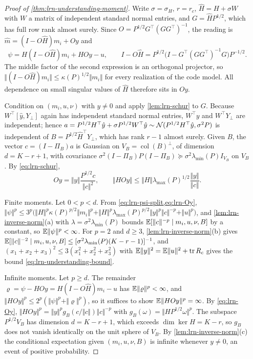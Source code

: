 \begin{proof}[Proof of \cref{thm:lrn-understanding-moment}]
Write $\sigma=\sigma_H$, $r=r_c$, $\hat H=H+\sigma W$ with $W$ a matrix of independent standard normal entries, and $G=\hat HP^{1/2}$, which has full row rank almost surely. Since $O=P^{1/2}G^\top(GG^\top)^{-1}$, the reading is $\hat m=(I-O\hat H)m_i+Oy$ and
\begin{equation}\label{eq:lrn-psi-split}
\psi=H(I-O\hat H)m_i+HOy-u,\qquad I-O\hat H=P^{1/2}\bigl(I-G^\top(GG^\top)^{-1}G\bigr)P^{-1/2}.
\end{equation}
The middle factor of the second expression is an orthogonal projector, so $\Vert(I-O\hat H)m_i\Vert\le\kappa(P)^{1/2}\Vert m_i\Vert$ for every realization of the code model. All dependence on small singular values of $\hat H$ therefore sits in $Oy$.

Condition on $(m_i,u,\nu)$ with $y\ne0$ and apply \cref{lem:lrn-schur} to $G$. Because $W^\top[\hat y,Y_\perp]$ again has independent standard normal entries, $W^\top\hat y$ and $W^\top Y_\perp$ are independent; hence $a=P^{1/2}H^\top\hat y+\sigma P^{1/2}W^\top\hat y\sim\mathcal{N}(P^{1/2}H^\top\hat y,\sigma^2P)$ is independent of $B=P^{1/2}\hat H^\top Y_\perp$, which has rank $r-1$ almost surely. Given $B$, the vector $c=(I-\Pi_B)a$ is Gaussian on $V_B=\operatorname{col}(B)^\perp$, of dimension $d=K-r+1$, with covariance $\sigma^2(I-\Pi_B)P(I-\Pi_B)\succeq\sigma^2\lambda_{\min}(P)I_{V_B}$ on $V_B$. By \cref{eq:lrn-schur},
\begin{equation}\label{eq:lrn-Oy}
Oy=\Vert y\Vert\frac{P^{1/2}c}{\Vert c\Vert^2},\qquad\Vert HOy\Vert\le\Vert H\Vert\lambda_{\max}(P)^{1/2}\frac{\Vert y\Vert}{\Vert c\Vert}.
\end{equation}

Finite moments. Let $0<p<d$. From \cref{eq:lrn-psi-split,eq:lrn-Oy}, $\Vert\psi\Vert^p\le3^p\bigl(\Vert H\Vert^p\kappa(P)^{p/2}\Vert m_i\Vert^p+\Vert H\Vert^p\lambda_{\max}(P)^{p/2}\Vert y\Vert^p\Vert c\Vert^{-p}+\Vert u\Vert^p\bigr)$, and \cref{lem:lrn-inverse-norm}(a) with $\lambda=\sigma^2\lambda_{\min}(P)$ bounds $\mathbb{E}[\Vert c\Vert^{-p}\mid m_i,u,\nu,B]$ by a constant, so $\mathbb{E}\Vert\psi\Vert^p<\infty$. For $p=2$ and $d\ge3$, \cref{lem:lrn-inverse-norm}(b) gives $\mathbb{E}[\Vert c\Vert^{-2}\mid m_i,u,\nu,B]\le[\sigma^2\lambda_{\min}(P)(K-r-1)]^{-1}$, and $(x_1+x_2+x_3)^2\le3(x_1^2+x_2^2+x_3^2)$ with $\mathbb{E}\Vert y\Vert^2=\mathbb{E}\Vert u\Vert^2+\operatorname{tr} R_c$ gives the bound \cref{eq:lrn-understanding-bound}.

Infinite moments. Let $p\ge d$. The remainder $\varrho=\psi-HOy=H(I-O\hat H)m_i-u$ has $\mathbb{E}\Vert\varrho\Vert^p<\infty$, and $\Vert HOy\Vert^p\le2^p(\Vert\psi\Vert^p+\Vert\varrho\Vert^p)$, so it suffices to show $\mathbb{E}\Vert HOy\Vert^p=\infty$. By \cref{eq:lrn-Oy}, $\Vert HOy\Vert^p=\Vert y\Vert^pg_B(c/\Vert c\Vert)\Vert c\Vert^{-p}$ with $g_B(\omega)=\Vert HP^{1/2}\omega\Vert^p$. The subspace $P^{1/2}V_B$ has dimension $d=K-r+1$, which exceeds $\dim\ker H=K-r$, so $g_B$ does not vanish identically on the unit sphere of $V_B$. By \cref{lem:lrn-inverse-norm}(c) the conditional expectation given $(m_i,u,\nu,B)$ is infinite whenever $y\ne0$, an event of positive probability.


\end{proof}
